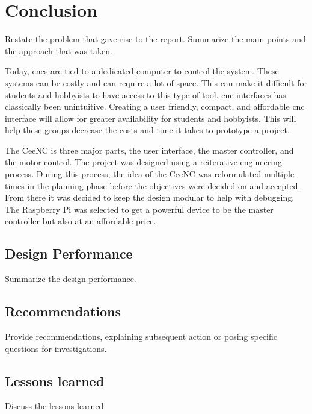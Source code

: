 \chapter{Conclusion}
Restate the problem that gave rise to the report. 
Summarize the main points and the approach that was taken. 

Today, \gls{cnc}s are tied to a dedicated computer to control the system.
These systems can be costly and can require a lot of space.
This can make it difficult for students and hobbyists to have access to this type of tool.
\gls{cnc} interfaces has classically been unintuitive.
Creating a user friendly, compact, and affordable \gls{cnc} interface will allow for greater availability for students and hobbyists.
This will help these groups decrease the costs and time it takes to prototype a project.

The CeeNC is three major parts, the user interface, the master controller, and the motor control.
The project was designed using a reiterative engineering process.
During this process, the idea of the CeeNC was reformulated multiple times in the planning phase before the objectives were decided on and accepted.
From there it was decided to keep the design modular to help with debugging.
The Raspberry Pi was selected to get a powerful device to be the master controller but also at an affordable price.
 
\section{Design Performance}
Summarize the design performance.
 
\section{Recommendations}
Provide recommendations, explaining subsequent action or posing specific questions for investigations. 

\section{Lessons learned}
Discuss the lessons learned. 